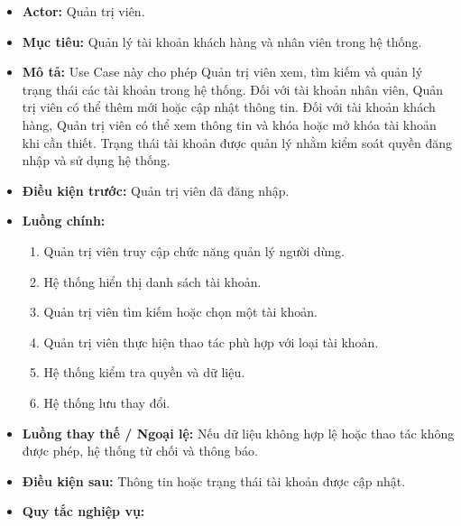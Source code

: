 \documentclass[12pt,a4paper]{article}
\begin{document}
\begin{itemize}

 \item \textbf{Actor:} Quản trị viên.

 \item \textbf{Mục tiêu:} Quản lý tài khoản khách hàng và nhân viên trong hệ thống.

 \item \textbf{Mô tả:} Use Case này cho phép Quản trị viên xem, tìm kiếm và quản lý trạng thái các tài khoản trong hệ thống. Đối với tài khoản nhân viên, Quản trị viên có thể thêm mới hoặc cập nhật thông tin. Đối với tài khoản khách hàng, Quản trị viên có thể xem thông tin và khóa hoặc mở khóa tài khoản khi cần thiết. Trạng thái tài khoản được quản lý nhằm kiểm soát quyền đăng nhập và sử dụng hệ thống.

 \item \textbf{Điều kiện trước:} Quản trị viên đã đăng nhập.

 \item \textbf{Luồng chính:}

 \begin{enumerate}

  \item Quản trị viên truy cập chức năng quản lý người dùng.

  \item Hệ thống hiển thị danh sách tài khoản.

  \item Quản trị viên tìm kiếm hoặc chọn một tài khoản.

  \item Quản trị viên thực hiện thao tác phù hợp với loại tài khoản.

  \item Hệ thống kiểm tra quyền và dữ liệu.

  \item Hệ thống lưu thay đổi.

 \end{enumerate}

 \item \textbf{Luồng thay thế / Ngoại lệ:} Nếu dữ liệu không hợp lệ hoặc thao tác không được phép, hệ thống từ chối và thông báo.

 \item \textbf{Điều kiện sau:} Thông tin hoặc trạng thái tài khoản được cập nhật.

 \item \textbf{Quy tắc nghiệp vụ:}


\end{itemize}
\end{document}
